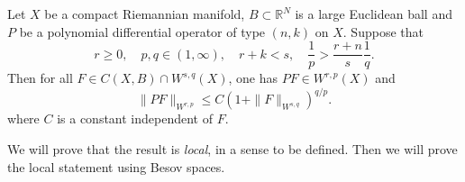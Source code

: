 \begin{theorem}
\label{thm:reg-poly-diff}
Let \(X\) be a compact Riemannian manifold, \(B\subset \mathbb{R}^N\) is a
large Euclidean ball and \(P\) be a polynomial differential
operator of type \((n,k)\) on \(X\). Suppose that
\begin{equation}
\label{eq:cond:thm:reg-poly-diff}
 r\geq 0,\quad p,q\in (1,\infty),\quad r+k < s, \quad \frac{1}{p}> \frac{r+n}{s} \frac{1}{q}.
\end{equation}
Then for all \(F\in C (X,B) \cap W^{s,q}(X)\), one has \(PF\in W^{r,p}(X)\) and
\[
 \|P F \|_{W^{r,p}} \leq C\left(1 + \|F\|_{W^{s,q}}\right)^{q/p}.
\]
where \(C\) is a constant independent of \(F\).
\end{theorem}

We will prove that the result is \emph{local}, in a sense to be defined. Then we will prove the
local statement using Besov spaces.

